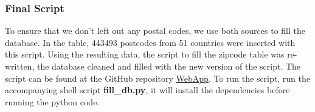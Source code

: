 \subsubsection{Final Script}

To ensure that we don't left out any postal codes, we use both sources to fill
the database.
In the table, 443493 postcodes from 51 countries were inserted with this script.
Using the resulting data, the script to fill the zipcode table was re-written, the database cleaned and filled with the new version of the script. The script can be found at the GitHub repository \href{https://github.com/dataBikeHsUlm/WebApp/blob/master/fill_db_postcodes.py}{WebApp}.
To run the script, run the accompanying shell script \textbf{fill\_db.py}, it will install the dependencies before running the python code.
